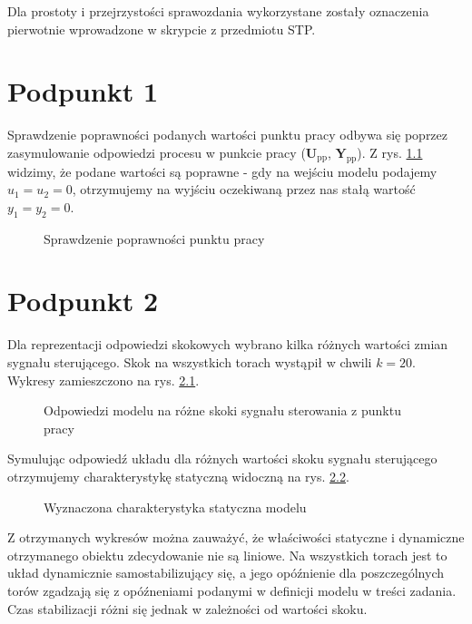 \bigskip
\bigskip

Dla prostoty i przejrzystości sprawozdania wykorzystane zostały oznaczenia pierwotnie wprowadzone w skrypcie z przedmiotu STP.

\chapter{Podpunkt 1}
Sprawdzenie poprawności podanych wartości punktu pracy odbywa się poprzez zasymulowanie odpowiedzi procesu w punkcie pracy ($\boldsymbol{U}_{\mathrm{pp}}$, $\boldsymbol{Y}_{\mathrm{pp}}$). Z rys. \ref{Z1} widzimy, że podane wartości są poprawne - gdy na wejściu modelu podajemy $u_1=u_2=0$, otrzymujemy na wyjściu oczekiwaną przez nas stałą wartość $y_1=y_2=\num{0}$.

\begin{figure}[ht]
\centering

\caption{Sprawdzenie poprawności punktu pracy}
\label{Z1}
\end{figure}


\chapter{Podpunkt 2}
Dla reprezentacji odpowiedzi skokowych wybrano kilka różnych wartości zmian sygnału sterującego. Skok na wszystkich torach wystąpił w chwili $ k=20 $. Wykresy zamieszczono na rys. \ref{Z2steps}.

\begin{figure}[ht]
\centering

\caption{Odpowiedzi modelu na różne skoki sygnału sterowania z punktu pracy} 
\label{Z2steps}
\end{figure}

Symulując odpowiedź układu dla różnych wartości skoku sygnału sterującego otrzymujemy charakterystykę statyczną widoczną na rys. \ref{Z2stat}.

\begin{figure}[ht]
\centering

\caption{Wyznaczona charakterystyka statyczna modelu}
\label{Z2stat}
\end{figure}

Z otrzymanych wykresów można zauważyć, że właściwości statyczne i dynamiczne otrzymanego obiektu zdecydowanie nie są liniowe. Na wszystkich torach jest to układ dynamicznie samostabilizujący się, a jego opóźnienie dla poszczególnych torów zgadzają się z opóźneniami podanymi w definicji modelu w treści zadania. Czas stabilizacji różni się jednak w zależności od wartości skoku.


